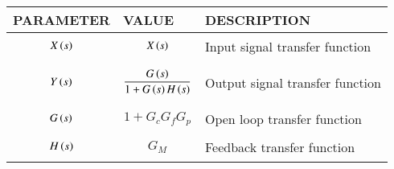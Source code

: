\begin{tabular}{|p{2cm}|p{2cm}|p{4cm}|}
    \hline
    PARAMETER & VALUE & DESCRIPTION   \\ \hline
    $$X\left(s\right)$$ & $$X\left(s\right)$$ & Input signal transfer function  \\ \hline
    $$Y\left(s\right)$$ & $$\frac{G\left(s\right)}{1+G\left(s\right)H\left(s\right)}$$ & Output signal transfer function \\ \hline
    $$G\left(s\right)$$ & $$1+G_c G_f G_p$$ & Open loop transfer function    \\ \hline
    $$H\left(s\right)$$ & $$G_M$$ & Feedback transfer function    \\ \hline
\end{tabular}
